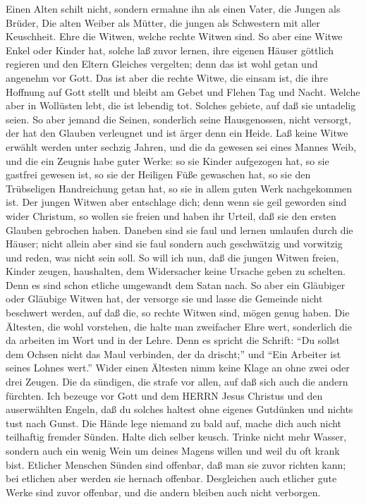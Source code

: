  Einen Alten schilt nicht, sondern ermahne ihn als einen
Vater, die Jungen als Brüder,  Die alten Weiber als Mütter,
die jungen als Schwestern mit aller Keuschheit.  Ehre die
Witwen, welche rechte Witwen sind.  So aber eine Witwe Enkel
oder Kinder hat, solche laß zuvor lernen, ihre eigenen Häuser göttlich
regieren und den Eltern Gleiches vergelten; denn das ist wohl getan und
angenehm vor Gott.  Das ist aber die rechte Witwe, die
einsam ist, die ihre Hoffnung auf Gott stellt und bleibt am Gebet und
Flehen Tag und Nacht.  Welche aber in Wollüsten lebt, die
ist lebendig tot.  Solches gebiete, auf daß sie untadelig
seien.  So aber jemand die Seinen, sonderlich seine
Hausgenossen, nicht versorgt, der hat den Glauben verleugnet und ist
ärger denn ein Heide.  Laß keine Witwe erwählt werden unter
sechzig Jahren, und die da gewesen sei eines Mannes Weib, 
und die ein Zeugnis habe guter Werke: so sie Kinder aufgezogen hat, so
sie gastfrei gewesen ist, so sie der Heiligen Füße gewaschen hat, so sie
den Trübseligen Handreichung getan hat, so sie in allem guten Werk
nachgekommen ist.  Der jungen Witwen aber entschlage dich;
denn wenn sie geil geworden sind wider Christum, so wollen sie freien
 und haben ihr Urteil, daß sie den ersten Glauben gebrochen
haben.  Daneben sind sie faul und lernen umlaufen durch die
Häuser; nicht allein aber sind sie faul sondern auch geschwätzig und
vorwitzig und reden, was nicht sein soll.  So will ich nun,
daß die jungen Witwen freien, Kinder zeugen, haushalten, dem Widersacher
keine Ursache geben zu schelten.  Denn es sind schon
etliche umgewandt dem Satan nach.  So aber ein Gläubiger
oder Gläubige Witwen hat, der versorge sie und lasse die Gemeinde nicht
beschwert werden, auf daß die, so rechte Witwen sind, mögen genug haben.
 Die Ältesten, die wohl vorstehen, die halte man zweifacher
Ehre wert, sonderlich die da arbeiten im Wort und in der Lehre.
 Denn es spricht die Schrift: ``Du sollst dem Ochsen nicht
das Maul verbinden, der da drischt;'' und ``Ein Arbeiter ist seines
Lohnes wert.''  Wider einen Ältesten nimm keine Klage an
ohne zwei oder drei Zeugen.  Die da sündigen, die strafe
vor allen, auf daß sich auch die andern fürchten.  Ich
bezeuge vor Gott und dem HERRN Jesus Christus und den auserwählten
Engeln, daß du solches haltest ohne eigenes Gutdünken und nichts tust
nach Gunst.  Die Hände lege niemand zu bald auf, mache dich
auch nicht teilhaftig fremder Sünden. Halte dich selber keusch.
 Trinke nicht mehr Wasser, sondern auch ein wenig Wein um
deines Magens willen und weil du oft krank bist.  Etlicher
Menschen Sünden sind offenbar, daß man sie zuvor richten kann; bei
etlichen aber werden sie hernach offenbar.  Desgleichen
auch etlicher gute Werke sind zuvor offenbar, und die andern bleiben
auch nicht verborgen.

